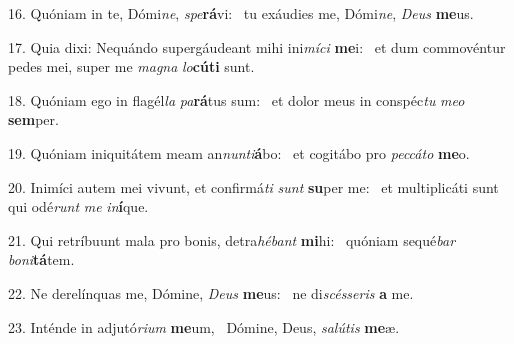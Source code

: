 16. Quóniam in te, Dómi\textit{ne}, \textit{spe}\textbf{rá}vi: \ast\  tu exáudies me, Dómi\textit{ne}, \textit{De}\textit{us} \textbf{me}us.\

17. Quia dixi: Nequándo supergáudeant mihi ini\textit{mí}\textit{ci} \textbf{me}i: \ast\  et dum commovéntur pedes mei, super me \textit{ma}\textit{gna} \textit{lo}\textbf{cú}\textbf{ti} sunt.\

18. Quóniam ego in flagél\textit{la} \textit{pa}\textbf{rá}tus sum: \ast\  et dolor meus in conspéc\textit{tu} \textit{me}\textit{o} \textbf{sem}per.\

19. Quóniam iniquitátem meam an\textit{nun}\textit{ti}\textbf{á}bo: \ast\  et cogitábo pro \textit{pec}\textit{cá}\textit{to} \textbf{me}o.\

20. Inimíci autem mei vivunt, et confirmá\textit{ti} \textit{sunt} \textbf{su}per me: \ast\  et multiplicáti sunt qui odé\textit{runt} \textit{me} \textit{in}\textbf{í}que.\

21. Qui retríbuunt mala pro bonis, detra\textit{hé}\textit{bant} \textbf{mi}hi: \ast\  quóniam sequé\textit{bar} \textit{bo}\textit{ni}\textbf{tá}tem.\

22. Ne derelínquas me, Dómine, \textit{De}\textit{us} \textbf{me}us: \ast\  ne di\textit{scés}\textit{se}\textit{ris} \textbf{a} me.\

23. Inténde in adjutó\textit{ri}\textit{um} \textbf{me}um, \ast\  Dómine, Deus, \textit{sa}\textit{lú}\textit{tis} \textbf{me}æ.\

